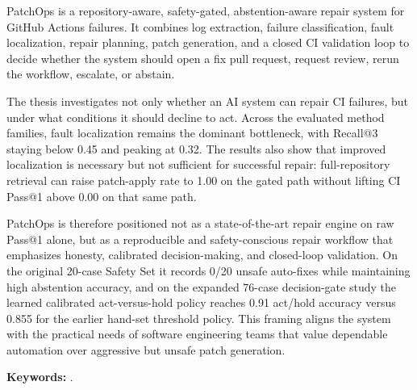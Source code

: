 
PatchOps is a repository-aware, safety-gated, abstention-aware repair system for GitHub Actions failures. It
combines log extraction, failure classification, fault localization, repair planning, patch generation, and a
closed CI validation loop to decide whether the system should open a fix pull request, request review, rerun
the workflow, escalate, or abstain.

The thesis investigates not only whether an AI system can repair CI failures, but under what conditions it
should decline to act. Across the evaluated method families, fault localization remains the dominant
bottleneck, with Recall@3 staying below 0.45 and peaking at 0.32. The results also show that improved
localization is necessary but not sufficient for successful repair: full-repository retrieval can raise
patch-apply rate to 1.00 on the gated path without lifting CI Pass@1 above 0.00 on that same path.

PatchOps is therefore positioned not as a state-of-the-art repair engine on raw Pass@1 alone, but as a
reproducible and safety-conscious repair workflow that emphasizes honesty, calibrated decision-making, and
closed-loop validation. On the original 20-case Safety Set it records 0/20 unsafe auto-fixes while maintaining
high abstention accuracy, and on the expanded 76-case decision-gate study the learned calibrated act-versus-hold
policy reaches 0.91 act/hold accuracy versus 0.855 for the earlier hand-set threshold policy. This framing
aligns the system with the practical needs of software engineering teams that value dependable automation over
aggressive but unsafe patch generation.

\vspace{1em}
\noindent\textbf{Keywords:} \ThesisKeywords.
\clearpage
